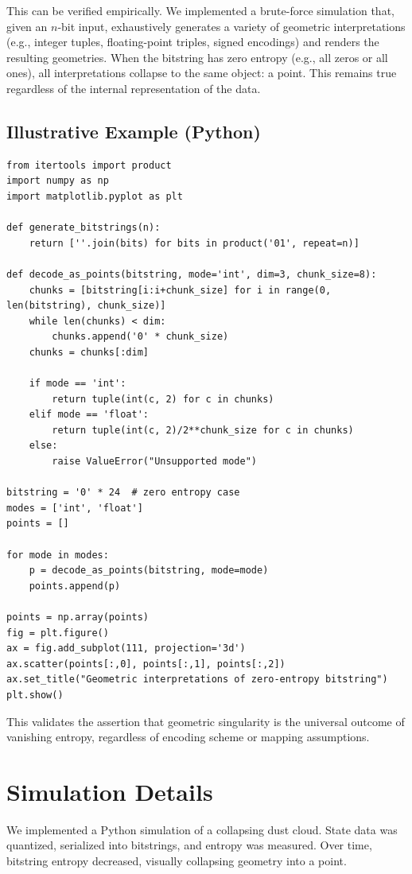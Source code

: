 \documentclass[11pt]{article}
\begin{document}
This can be verified empirically. We implemented a brute-force simulation that, given an $n$-bit input, exhaustively generates a variety of geometric interpretations (e.g., integer tuples, floating-point triples, signed encodings) and renders the resulting geometries. When the bitstring has zero entropy (e.g., all zeros or all ones), all interpretations collapse to the same object: a point. This remains true regardless of the internal representation of the data.

\subsection*{Illustrative Example (Python)}

\begin{verbatim}
from itertools import product
import numpy as np
import matplotlib.pyplot as plt

def generate_bitstrings(n):
    return [''.join(bits) for bits in product('01', repeat=n)]

def decode_as_points(bitstring, mode='int', dim=3, chunk_size=8):
    chunks = [bitstring[i:i+chunk_size] for i in range(0, len(bitstring), chunk_size)]
    while len(chunks) < dim:
        chunks.append('0' * chunk_size)
    chunks = chunks[:dim]

    if mode == 'int':
        return tuple(int(c, 2) for c in chunks)
    elif mode == 'float':
        return tuple(int(c, 2)/2**chunk_size for c in chunks)
    else:
        raise ValueError("Unsupported mode")

bitstring = '0' * 24  # zero entropy case
modes = ['int', 'float']
points = []

for mode in modes:
    p = decode_as_points(bitstring, mode=mode)
    points.append(p)

points = np.array(points)
fig = plt.figure()
ax = fig.add_subplot(111, projection='3d')
ax.scatter(points[:,0], points[:,1], points[:,2])
ax.set_title("Geometric interpretations of zero-entropy bitstring")
plt.show()
\end{verbatim}

This validates the assertion that geometric singularity is the universal outcome of vanishing entropy, regardless of encoding scheme or mapping assumptions.


\section{Simulation Details}

We implemented a Python simulation of a collapsing dust cloud. State data was quantized, serialized into bitstrings, and entropy was measured. Over time, bitstring entropy decreased, visually collapsing geometry into a point.
\end{document}
